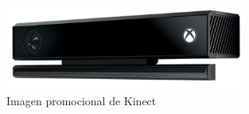 \begin{figure}
    \centering
    \label{fig:kinect}
    \includegraphics[width=0.7\textwidth]{images/kinect}
    \caption{Imagen promocional de Kinect}
\end{figure}